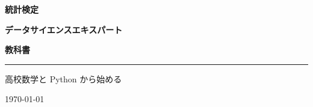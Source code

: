 \begin{titlepage}
  \centering
  \vspace*{0.22\textheight}
  {\sffamily\gtfamily\bfseries\Large 統計検定\par}
  \vspace{0.8\baselineskip}
  {\sffamily\gtfamily\bfseries\Huge\color{tbMain} データサイエンスエキスパート\par}
  \vspace{0.6\baselineskip}
  {\sffamily\gtfamily\bfseries\LARGE 教科書\par}
  \vspace{1.2\baselineskip}
  {\color{tbMain}\rule{0.6\textwidth}{1pt}\par}
  \vspace{1.2\baselineskip}
  {\large 高校数学と Python から始める\par}
  \vfill
  {\large \today\par}
\end{titlepage}
